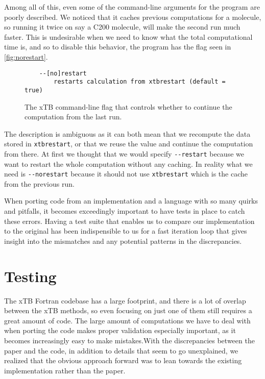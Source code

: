 Among all of this, even some of the command-line arguments for the program are poorly described. We noticed that it caches previous computations for a molecule, so running it twice on say a C200 molecule, will make the second run much faster. This is undesirable when we need to know what the total computational time is, and so to disable this behavior, the program has the flag seen in \autoref{fig:norestart}.
\begin{figure}[H]
\begin{verbatim}
    --[no]restart
        restarts calculation from xtbrestart (default = true)
\end{verbatim}
\caption{The xTB command-line flag that controls whether to continue the computation from the last run.}
\label{fig:norestart}
\end{figure}

The description is ambiguous as it can both mean that we recompute the data stored in \verb|xtbrestart|, or that we reuse the value and continue the computation from there. At first we thought that we would specify \verb|--restart| because we want to restart the whole computation without any caching. In reality what we need is \verb|--norestart| because it should not use \verb|xtbrestart| which is the cache from the previous run.

When porting code from an implementation and a language with so many quirks and pitfalls, it becomes exceedingly important to have tests in place to catch these errors. Having a test suite that enables us to compare our implementation to the original has been indispensible to us for a fast iteration loop that gives insight into the mismatches and any potential patterns in the discrepancies.


\section{Testing}

The xTB Fortran codebase has a large footprint, and there is a lot of overlap between the xTB methods, so even focusing on just one of them still requires a great amount of code.
The large amount of computations we have to deal with when porting the code makes proper validation especially important, as it becomes increasingly easy to make mistakes.With the discrepancies between the paper and the code, in addition to details that seem to go unexplained, we realized that the obvious approach forward was to lean towards the existing implementation rather than the paper.

